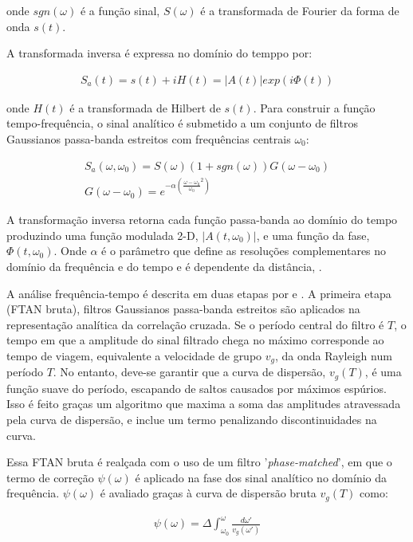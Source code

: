 onde $sgn(\omega)$ é a função sinal, $S(\omega)$ é a transformada de Fourier da forma de onda $s(t)$.

A transformada inversa é expressa no domínio do temppo por:

\begin{eqnarray}
S_{a}(t) = s(t) + iH(t) = \left | A(t) \right |exp(i\Phi(t))
\end{eqnarray}

onde $H(t)$ é a transformada de Hilbert de $s(t)$. Para construir a função tempo-frequência, o sinal analítico é submetido a um conjunto de filtros Gaussianos passa-banda estreitos com frequências centrais $\omega _{0}$:

\begin{eqnarray}
S_{a}(\omega,\omega _{0}) = S(\omega)(1 + sgn(\omega))G(\omega - \omega _{0})
\\
G(\omega - \omega _{0}) = e^{-\alpha(\frac{\omega - \omega _{0}}{\omega _{0}}^{2})}
\end{eqnarray}

A transformação inversa retorna cada função passa-banda ao domínio do tempo produzindo uma função modulada 2-D, $\left | A(t,\omega _{0}) \right |$, e uma função da fase, $ \Phi(t,\omega _{0}) $. Onde $\alpha$ é o parâmetro que define as resoluções complementares no domínio da frequência e do tempo e é dependente da distância, \cite{levshin_automated_2001}.

A análise frequência-tempo é descrita em duas etapas por \cite{levshin_automated_2001} e \cite{bensen_processing_2007}. A primeira etapa (FTAN bruta), filtros Gaussianos passa-banda estreitos são aplicados na representação analítica da correlação cruzada. Se o período central do filtro é $T$, o tempo em que a amplitude do sinal filtrado chega no máximo corresponde ao tempo de viagem, equivalente a velocidade de grupo $v_{g}$, da onda Rayleigh num período $T$. No entanto, deve-se garantir que a curva de dispersão, $v_{g}(T)$, é uma função suave do período, escapando de saltos causados por máximos espúrios. Isso é feito graças um algoritmo que maxima a soma das amplitudes atravessada pela curva de dispersão, e inclue um termo penalizando discontinuidades na curva.

Essa FTAN bruta é realçada com o uso de um filtro '\textit{phase-matched}', em que o termo de correção $\psi(\omega)$ é aplicado na fase dos sinal analítico no domínio da frequência. $\psi(\omega)$ é avaliado graças à curva de dispersão bruta $v_{g}(T)$ como:

\begin{eqnarray}
\psi(\omega) = \Delta \int_{\omega_{0}}^{\omega} \frac{{d\omega}'}{v_{g}({\omega}')}
\end{eqnarray}

